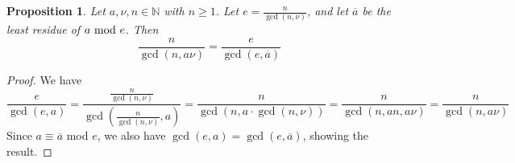 \documentclass[12pt]{amsart}
\numberwithin{equation}{section}
\newtheorem{prop}[equation]{Proposition}
\theoremstyle{definition}
\newcommand{\N}{\mathbb N}
\renewcommand{\c}[1]{\overline{#1}}
\begin{document}

\begin{prop}\label{prop: ramification index simplified}
    Let $a,\nu,n\in\N$ with $n\geq 1$. Let $e=\frac{n}{\gcd(n,\nu)}$, and let $\c{a}$ be the least residue of $a\textup{ mod }e$. Then
    \[\frac{n}{\gcd(n,a\nu)}=\frac{e}{\gcd(e,\c{a})}\]
\end{prop}
\begin{proof}
    We have
    \[\frac{e}{\gcd(e,a)}=\frac{\frac{n}{\gcd(n,\nu)}}{\gcd(\frac{n}{\gcd(n,\nu)},a)}=\frac{n}{\gcd(n,a\cdot \gcd(n,\nu))}=\frac{n}{\gcd(n,an,a\nu)}=\frac{n}{\gcd(n,a\nu)}\]
    Since $a\equiv \c{a}$ mod $e$, we also have $\gcd(e,a)=\gcd(e,\c{a})$, showing the result.
\end{proof}
\end{document}
